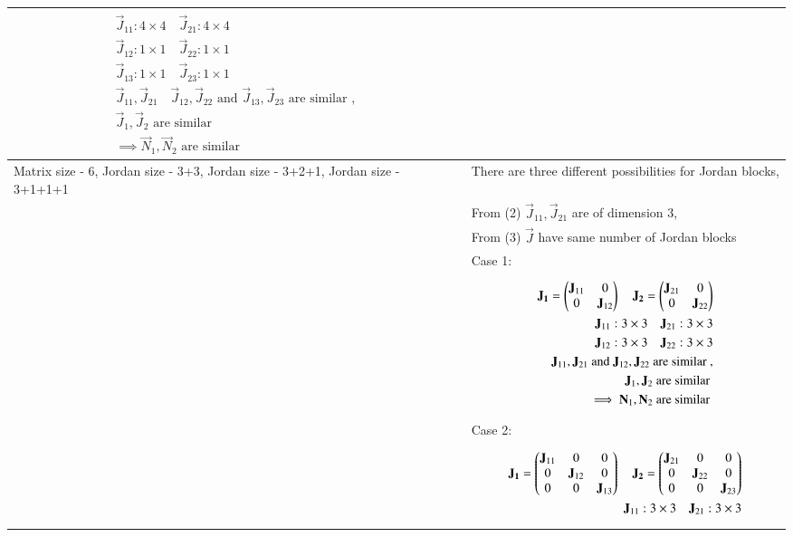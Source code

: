 \begin{longtable}{|p{5cm}|p{13cm}|}
{\begin{align*}
    \vec{J}_{11}: 4\times4 \quad \vec{J}_{21}: 4\times4\\
    \vec{J}_{12}: 1\times1 \quad \vec{J}_{22}: 1\times1\\
    \vec{J}_{13}: 1\times1 \quad \vec{J}_{23}: 1\times1\\
    \vec{J}_{11}, \vec{J}_{21}\quad \vec{J}_{12}, \vec{J}_{22}  \text{ and } \vec{J}_{13}, \vec{J}_{23} \text{ are similar }, \\
    \vec{J}_{1}, \vec{J}_{2} \text{ are similar }\\
    \implies \vec{N}_{1}, \vec{N}_{2} \text{ are similar }
\end{align*}}\\
\hline
Matrix size - 6, Jordan size - 3+3, Jordan size - 3+2+1, Jordan size - 3+1+1+1 & There are three different possibilities for Jordan blocks,
\\& From (2) $\vec{J}_{11}, \vec{J}_{21} $ are of dimension 3, \\& From (3) $\vec{J}$ have same number of Jordan blocks
\\& Case 1: 
\\&
\parbox{12cm}{\begin{align*}
    \mathbf{J_1}=\begin{pmatrix}\mathbf{J}_{11} & 0 \\ 0&\mathbf{J}_{12}\end{pmatrix} \quad \mathbf{J_2}=\begin{pmatrix}\mathbf{J}_{21} & 0 \\ 0&\mathbf{J}_{22}\end{pmatrix}\\
    \mathbf{J}_{11}: 3\times3 \quad \mathbf{J}_{21}: 3\times3\\
    \mathbf{J}_{12}: 3\times3 \quad \mathbf{J}_{22}: 3\times3\\
    \mathbf{J}_{11}, \mathbf{J}_{21} \text{ and } \mathbf{J}_{12}, \mathbf{J}_{22} \text{ are similar }, \\
    \mathbf{J}_{1}, \mathbf{J}_{2} \text{ are similar }\\
    \implies \mathbf{N}_{1}, \mathbf{N}_{2} \text{ are similar }
\end{align*}}
\\& Case 2: 
\\&
\parbox{12cm}{\begin{align*}
    \vec{J_1}=\myvec{\vec{J}_{11} & 0&0 \\ 0&\vec{J}_{12}&0\\0&0&\vec{J}_{13}} \quad \vec{J_2}=\myvec{\vec{J}_{21} & 0&0 \\ 0&\vec{J}_{22}&0\\0&0&\vec{J}_{23}}\\
    \vec{J}_{11}: 3\times3 \quad \vec{J}_{21}: 3\times3\\

\end{align*}}
\end{longtable}
